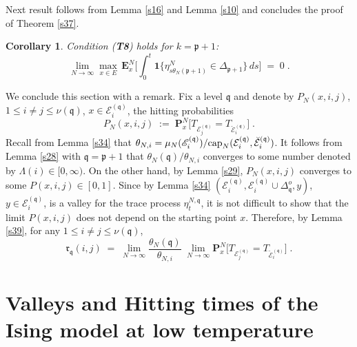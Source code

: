 \documentclass[reqno]{amsart}
\newtheorem{corollary}[theorem]{Corollary}
\begin{document}
Next result follows from Lemma \ref{s16} and Lemma \ref{s10} and
concludes the proof of Theorem \ref{s37}.

\begin{corollary}
\label{s36}
Condition {\rm ({\bf T8})} holds for $k={{\mathfrak p}}+1$: 
\begin{equation*}
\lim_{N\to \infty} \max_{x\in E} \, {{\mathbf E}}^N_x \Big[
\int_0^t {{\mathbf 1}}\{ \eta^N_{s\theta_N({{\mathfrak p}}+1)} \in \Delta_{{{\mathfrak p}}+1}\} 
\, ds  \Big] \;=\; 0\;. 
\end{equation*}
\end{corollary}

We conclude this section with a remark. Fix a level ${{\mathfrak q}}$ and denote
by $P_N(x,i,j)$, $1\le i\not = j\le \nu({{\mathfrak q}})$, $x\in {{\mathcal E}}^{({{\mathfrak q}})}_i$, the hitting probabilities
\begin{equation}
\label{38}
P_N(x,i,j) \;:=\; 
{{\mathbf P}}^N_x \big[ T_{{{\mathcal E}}^{({{\mathfrak q}})}_j} = T_{\breve{{{\mathcal E}}}^{({{\mathfrak q}})}_i} \big]\;.
\end{equation}
Recall from Lemma \ref{s34} that $\theta_{N,i}= \mu_N({{\mathscr E}}^{({{\mathfrak q}})}_i)/ {{\rm cap}}_N({{\mathcal E}}^{({{\mathfrak q}})}_i , \breve{{{\mathcal E}}}^{({{\mathfrak q}})}_i)$. It
follows from Lemma \ref{s28} with ${{\mathfrak q}}={{\mathfrak p}}+1$ that $\theta_N({{\mathfrak q}})/\theta_{N,i}$ converges to some number denoted by $\Lambda(i) \in
[0,\infty)$.  On the other hand, by Lemma \ref{s29}, $P_N(x,i,j)$
converges to some $P(x,i,j)\in [0,1]$. Since by Lemma \ref{s34} $({{\mathcal E}}^{({{\mathfrak q}})}_i, {{\mathcal E}}^{({{\mathfrak q}})}_i \cup \Delta^o_{{{\mathfrak q}}}, y)$, $y\in {{\mathcal E}}^{({{\mathfrak q}})}_i$, is a valley for the trace process $\eta^{N,{{\mathfrak q}}}_t$,
it is not difficult to show that the limit $P(x,i,j)$ does not depend
on the starting point $x$. Therefore, by Lemma \ref{s39}, for any
$1\le i\not = j\le \nu({{\mathfrak q}})$,
\begin{equation}
\label{41}
{{\mathfrak r}}_{{{\mathfrak q}}}(i,j) \;=\; \lim_{N\to\infty} \frac{\theta_N({{\mathfrak q}})}{\theta_{N,i}}\; \lim_{N\to\infty}
{{\mathbf P}}^N_x \big[ T_{{{\mathcal E}}^{({{\mathfrak q}})}_j} = T_{\breve{{{\mathcal E}}}^{({{\mathfrak q}})}_i}
\big]\;. 
\end{equation}

\section{Valleys and Hitting times of the Ising model at low
  temperature}
\label{si2}
\end{document}
